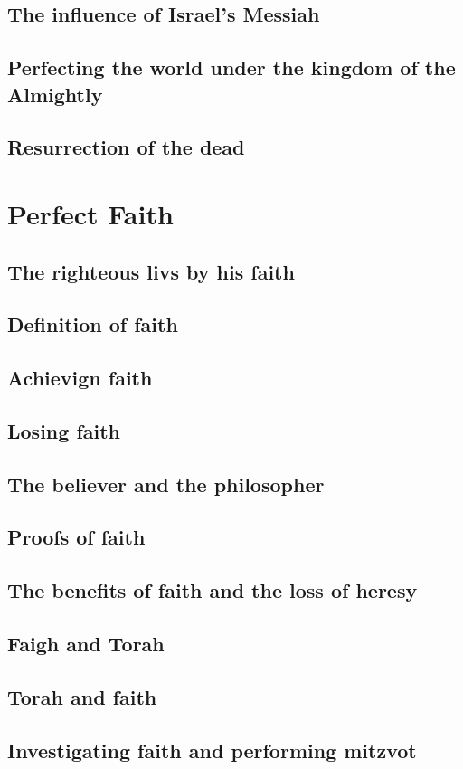 \documentclass[11pt, a5paper, twoside, chapterprefix, openany]{scrbook}
\begin{document}
\chapter{The influence of Israel’s Messiah}
\chapter{Perfecting the world under the kingdom of the Almightly}
\chapter{Resurrection of the dead}
\part{Perfect Faith}
\chapter{The righteous livs by his faith}
\chapter{Definition of faith}
\chapter{Achievign faith}
\chapter{Losing faith}
\chapter{The believer and the philosopher}
\chapter{Proofs of faith}
\chapter{The benefits of faith and the loss of heresy}
\chapter{Faigh and Torah}
\chapter{Torah and faith}
\chapter{Investigating faith and performing mitzvot}
\end{document}
